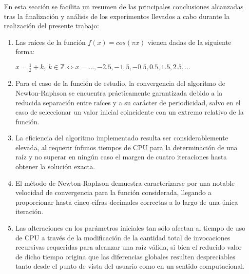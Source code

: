 
\setlength{\parskip}{2mm}

En esta secci\'on se facilita un resumen de las principales conclusiones alcanzadas
tras la finalizaci\'on y an\'alisis de los experimentos llevados a cabo durante la
realizaci\'on del presente trabajo:

\begin{enumerate}
    \item
      Las ra\'ices de la funci\'on $f(x) = cos (\pi x)$ vienen dadas de la siguiente forma:
      \begin{center}
      $x = \frac{1}{2} + k, \ k \in \mathbb{Z} \iff x = ..., -2.5, -1,5, -0.5, 0.5, 1.5, 2.5, ...$
      \end{center}
    \item
      Para el caso de la funci\'on de estudio, la convergencia del algoritmo de Newton-Raphson
      se encuentra pr\'acticamente garantizada debido a la reducida separaci\'on entre ra\'ices y 
      a su car\'acter de periodicidad, salvo en el caso de seleccionar un valor inicial coincidente
      con un extremo relativo de la funci\'on.
    \item
      La eficiencia del algoritmo implementado resulta ser considerablemente elevada, al requerir
      \'infimos tiempos de CPU para la determinaci\'on de una ra\'iz y no superar en ning\'un caso el 
      margen de cuatro iteraciones hasta obtener la soluci\'on exacta.
    \item
      El m\'etodo de Newton-Raphson demuestra caracterizarse por una notable velocidad de convergencia
      para la funci\'on considerada, llegando a proporcionar hasta cinco cifras decimales correctas a 
      lo largo de una \'unica iteraci\'on.
    \item
      Las alteraciones en los par\'ametros iniciales tan s\'olo afectan al tiempo de uso de CPU a trav\'es
      de la modificaci\'on de la cantidad total de invocaciones recursivas requeridas para alcanzar
      una ra\'iz v\'alida, si bien el reducido valor de dicho tiempo origina que las diferencias globales
      resulten despreciables tanto desde el punto de vista del usuario como en un sentido computacional.
\end{enumerate}


